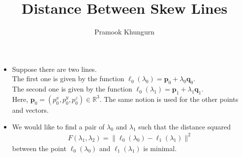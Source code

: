 \documentclass[10pt]{article}
\title{Distance Between Skew Lines}
\author{Pramook Khungurn}
\newcommand{\ve}[1]{\mathbf{#1}}
\newcommand{\Real}{\mathbb{R}}
\begin{document}
	\maketitle

  \begin{itemize}
    \item Suppose there are two lines.\\
    The first one is given by the function $\ell_0(\lambda_0) = \ve{p}_0 + \lambda_0 \ve{q}_0$.\\
    The second one is given by the function $\ell_0(\lambda_1) = \ve{p}_1 + \lambda_1 \ve{q}_1$.\\
    Here, $\ve{p}_0 = (p_0^x, p_0^y, p_0^z) \in \Real^3$. The same notion is used for the other points and vectors.

    \item We would like to find a pair of $\lambda_0$ and $\lambda_1$ such that the distance squared 
    \begin{align*}    
      F(\lambda_1,\lambda_2) = \| \ell_0(\lambda_0) - \ell_1(\lambda_1) \|^2
    \end{align*}
    between the point $\ell_0(\lambda_0)$ and $\ell_1(\lambda_1)$ is minimal.


\end{itemize}
\end{document}
